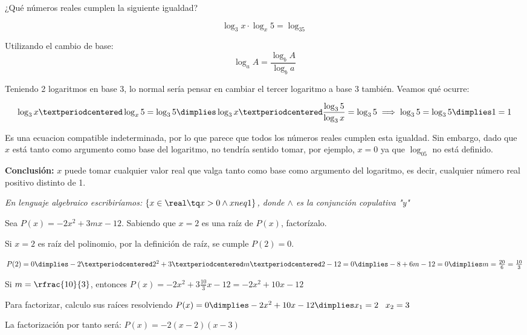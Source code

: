 \documentclass[palatino,nosec,nochap]{Docencia}
\begin{document}
\begin{problem}

¿Qué números reales cumplen la siguiente igualdad?

\[\log_3x·\log_x5 = \log_35\]

\solution

Utilizando el cambio de base: \[ \log_aA =\frac{\log_bA}{\log_ba}\] 

Teniendo 2 logaritmos en base 3, lo normal sería pensar en cambiar el tercer logaritmo a base 3 también. Veamos qué ocurre:

\[
	\log_3x·\log_x5 = \log_35 \dimplies \log_3x·\frac{\log_35}{\log_3x} = \log_35 \implies \log_35 = \log_35 \dimplies 1=1
\]

Es una ecuacion compatible indeterminada, por lo que parece que todos los números reales cumplen esta igualdad. 
%
Sin embargo, dado que $x$ está tanto como argumento como base del logaritmo, no tendría sentido tomar, por ejemplo, $x=0$ ya que $\log_05$ no está definido. 

\textbf{Conclusión: } $x$ puede tomar cualquier valor real que valga tanto como base como argumento del logaritmo, es decir, cualquier número real positivo distinto de 1. 

\textit{ En lenguaje algebraico escribiríamos: $\{x\in\real\tq x>0 \wedge x neq 1\}$, donde $\wedge$ es la conjunción copulativa "y"}

\end{problem}

\begin{problem} Sea $P(x) = -2x^2+3mx-12$. Sabiendo que $x=2$ es una raíz de $P(x)$, factorízalo.

\solution

Si $x=2$ es raíz del polinomio, por la definición de raíz, se cumple $P(2) = 0$.

$P(2) = 0 \dimplies -2·2^2 + 3·m·2 - 12 = 0 \dimplies -8 + 6m -12 = 0 \dimplies m=\frac{20}{6} = \frac{10}{3}$

Si $m=\rfrac{10}{3}$, entonces $P(x) = -2x^2+3\frac{10}{3}x-12 = -2x^2+10x-12$

Para factorizar, calculo sus raíces resolviendo $P(x) = 0 \dimplies -2x^2+10x-12 \dimplies x_1=2 \;\;\; x_2=3$

La factorización por tanto será: $P(x) = -2(x-2)(x-3)$

\end{problem}
\end{document}
